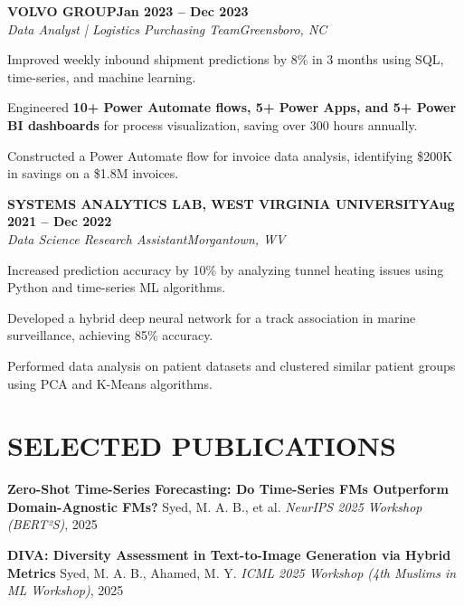 \documentclass[letterpaper,10pt]{article}
\newcommand{\heading}[2]{
  \hspace{0pt}#1\hfill#2\\
}
\newcommand{\headingBf}[2]{
  \heading{\textbf{#1}}{\textbf{#2}}
}
\newcommand{\headingIt}[2]{
  \heading{\textit{#1}}{\textit{#2}}
  \vspace{0.2em}
}
\newenvironment{resume_list}{
  \vspace{-7pt}
  \begin{itemize}[itemsep=-0.5pt, parsep=1pt, leftmargin=20pt]
}{
  \end{itemize}
}
\begin{document}
\headingBf{VOLVO GROUP}{Jan 2023 -- Dec 2023}
\headingIt{Data Analyst | Logistics Purchasing Team}{Greensboro, NC}
\begin{justify}
\begin{resume_list}
\item Improved weekly inbound shipment predictions by 8\% in 3 months using SQL, time-series, and machine learning.
\item Engineered \textbf{10+ Power Automate flows, 5+ Power Apps, and 5+ Power BI dashboards} for process visualization, saving over 300 hours annually.
\item Constructed a Power Automate flow for invoice data analysis, identifying \$200K in savings on a \$1.8M invoices.
\end{resume_list}
\end{justify}

\headingBf{SYSTEMS ANALYTICS LAB, WEST VIRGINIA UNIVERSITY}{Aug 2021 -- Dec 2022}
\headingIt{Data Science Research Assistant}{Morgantown, WV}
\begin{justify}
\begin{resume_list}
\item Increased prediction accuracy by 10\% by analyzing tunnel heating issues using Python and time-series ML algorithms.
\item Developed a hybrid deep neural network for a track association in marine surveillance, achieving 85\% accuracy.
\item Performed data analysis on patient datasets and clustered similar patient groups using PCA and K-Means algorithms.
\end{resume_list}
\end{justify}


  \section{SELECTED PUBLICATIONS}

  \begin{resume_list}
  \item \textbf{Zero-Shot Time-Series Forecasting: Do Time-Series FMs Outperform Domain-Agnostic FMs?} Syed, M. A. B., et al. \textit{NeurIPS 2025 Workshop (BERT²S)}, 2025
  \item \textbf{DIVA: Diversity Assessment in Text-to-Image Generation via Hybrid Metrics} Syed, M. A. B., Ahamed, M. Y. \textit{ICML 2025 Workshop (4th Muslims in ML Workshop)}, 2025
  \end{resume_list}
\end{document}
